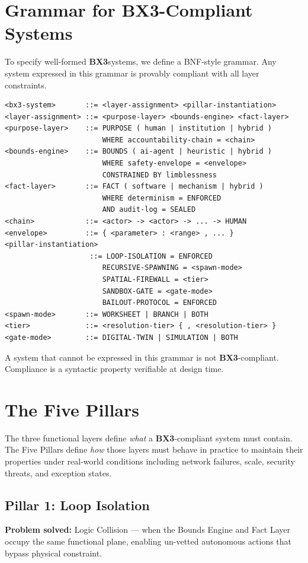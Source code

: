 \documentclass[12pt]{article}
\newcommand{\bxthree}{\textbf{BX3}}
\begin{document}
\section{Grammar for BX3-Compliant Systems}
\label{sec:grammar}

To specify well-formed \bxthree systems, we define a BNF-style grammar. Any system expressed in this grammar is provably compliant with all layer constraints.

\begin{verbatim}
<bx3-system>       ::= <layer-assignment> <pillar-instantiation>
<layer-assignment> ::= <purpose-layer> <bounds-engine> <fact-layer>
<purpose-layer>    ::= PURPOSE ( human | institution | hybrid )
                       WHERE accountability-chain = <chain>
<bounds-engine>    ::= BOUNDS ( ai-agent | heuristic | hybrid )
                       WHERE safety-envelope = <envelope>
                       CONSTRAINED BY limblessness
<fact-layer>       ::= FACT ( software | mechanism | hybrid )
                       WHERE determinism = ENFORCED
                       AND audit-log = SEALED
<chain>            ::= <actor> -> <actor> -> ... -> HUMAN
<envelope>         ::= { <parameter> : <range> , ... }
<pillar-instantiation>
                    ::= LOOP-ISOLATION = ENFORCED
                       RECURSIVE-SPAWNING = <spawn-mode>
                       SPATIAL-FIREWALL = <tier>
                       SANDBOX-GATE = <gate-mode>
                       BAILOUT-PROTOCOL = ENFORCED
<spawn-mode>       ::= WORKSHEET | BRANCH | BOTH
<tier>             ::= <resolution-tier> { , <resolution-tier> }
<gate-mode>        ::= DIGITAL-TWIN | SIMULATION | BOTH
\end{verbatim}

A system that cannot be expressed in this grammar is not \bxthree-compliant. Compliance is a syntactic property verifiable at design time.

\section{The Five Pillars}
\label{sec:pillars}

The three functional layers define \textit{what} a \bxthree-compliant system must contain. The Five Pillars define \textit{how} those layers must behave in practice to maintain their properties under real-world conditions including network failures, scale, security threats, and exception states.

\subsection{Pillar 1: Loop Isolation}
\textbf{Problem solved:} Logic Collision --- when the Bounds Engine and Fact Layer occupy the same functional plane, enabling un-vetted autonomous actions that bypass physical constraint.
\end{document}

